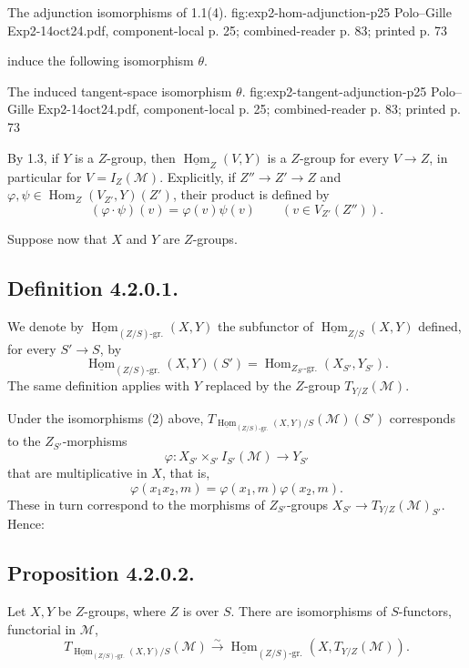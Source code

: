   {The adjunction isomorphisms of 1.1(4).}
  {fig:exp2-hom-adjunction-p25}
  {Polo--Gille Exp2-14oct24.pdf, component-local p. 25; combined-reader p. 83; printed p. 73}

induce the following isomorphism \(\theta\).

  {The induced tangent-space isomorphism \(\theta\).}
  {fig:exp2-tangent-adjunction-p25}
  {Polo--Gille Exp2-14oct24.pdf, component-local p. 25; combined-reader p. 83; printed p. 73}

By 1.3, if \(Y\) is a \(Z\)-group, then
\(\underline{\operatorname{Hom}}_Z(V,Y)\) is a \(Z\)-group for every
\(V\to Z\), in particular for \(V=I_Z(\mathcal M)\). Explicitly, if
\(Z''\to Z'\to Z\) and
\(\varphi,\psi\in\operatorname{Hom}_Z(V_{Z'},Y)(Z')\), their product is
defined by
\[
  (\varphi\cdot\psi)(v)=\varphi(v)\psi(v)
  \qquad (v\in V_{Z'}(Z'')).
\]

Suppose now that \(X\) and \(Y\) are \(Z\)-groups.

\subsection*{Definition 4.2.0.1.}
We denote by
\(\underline{\operatorname{Hom}}_{(Z/S)\text{-gr.}}(X,Y)\) the
subfunctor of \(\underline{\operatorname{Hom}}_{Z/S}(X,Y)\) defined, for
every \(S'\to S\), by
\begin{equation}
 \underline{\operatorname{Hom}}_{(Z/S)\text{-gr.}}(X,Y)(S')
 =\operatorname{Hom}_{Z_{S'}\text{-gr.}}(X_{S'},Y_{S'}).
 \tag{3}
\end{equation}
The same definition applies with \(Y\) replaced by the \(Z\)-group
\(T_{Y/Z}(\mathcal M)\).

Under the isomorphisms (2) above,
\(T_{\underline{\operatorname{Hom}}_{(Z/S)\text{-gr.}}(X,Y)/S}
(\mathcal M)(S')\) corresponds to the \(Z_{S'}\)-morphisms
\[
 \varphi:X_{S'}\times_{S'}I_{S'}(\mathcal M)\longrightarrow Y_{S'}
\]
that are multiplicative in \(X\), that is,
\[
 \varphi(x_1x_2,m)=\varphi(x_1,m)\varphi(x_2,m).
\]
These in turn correspond to the morphisms of \(Z_{S'}\)-groups
\(X_{S'}\to T_{Y/Z}(\mathcal M)_{S'}\). Hence:

\subsection*{Proposition 4.2.0.2.}
Let \(X,Y\) be \(Z\)-groups, where \(Z\) is over \(S\). There are
isomorphisms of \(S\)-functors, functorial in \(\mathcal M\),
\[
 T_{\underline{\operatorname{Hom}}_{(Z/S)\text{-gr.}}(X,Y)/S}
   (\mathcal M)
 \xrightarrow{\sim}
 \underline{\operatorname{Hom}}_{(Z/S)\text{-gr.}}
   (X,T_{Y/Z}(\mathcal M)).
\]

